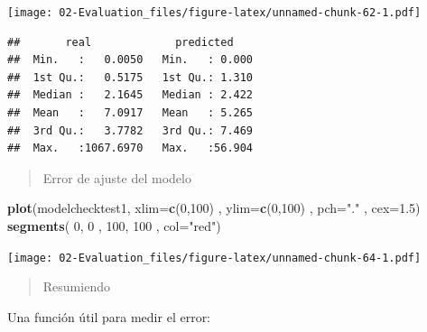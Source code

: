 \documentclass[]{book}
\newenvironment{Shaded}{\begin{snugshade}}{\end{snugshade}}
\newcommand{\DataTypeTok}[1]{\textcolor[rgb]{0.13,0.29,0.53}{#1}}
\newcommand{\DecValTok}[1]{\textcolor[rgb]{0.00,0.00,0.81}{#1}}
\newcommand{\FloatTok}[1]{\textcolor[rgb]{0.00,0.00,0.81}{#1}}
\newcommand{\KeywordTok}[1]{\textcolor[rgb]{0.13,0.29,0.53}{\textbf{#1}}}
\newcommand{\NormalTok}[1]{#1}
\newcommand{\OperatorTok}[1]{\textcolor[rgb]{0.81,0.36,0.00}{\textbf{#1}}}
\newcommand{\StringTok}[1]{\textcolor[rgb]{0.31,0.60,0.02}{#1}}
\begin{document}
\texttt{[image: 02-Evaluation\_files/figure-latex/unnamed-chunk-62-1.pdf]}

\begin{Shaded}
\end{Shaded}

\begin{verbatim}
##       real             predicted     
##  Min.   :   0.0050   Min.   : 0.000  
##  1st Qu.:   0.5175   1st Qu.: 1.310  
##  Median :   2.1645   Median : 2.422  
##  Mean   :   7.0917   Mean   : 5.265  
##  3rd Qu.:   3.7782   3rd Qu.: 7.469  
##  Max.   :1067.6970   Max.   :56.904
\end{verbatim}

\begin{quote}
Error de ajuste del modelo
\end{quote}

\begin{Shaded}
\begin{Highlighting}[]
\KeywordTok{plot}\NormalTok{(modelchecktest1, }\DataTypeTok{xlim=}\KeywordTok{c}\NormalTok{(}\DecValTok{0}\NormalTok{,}\DecValTok{100}\NormalTok{) , }\DataTypeTok{ylim=}\KeywordTok{c}\NormalTok{(}\DecValTok{0}\NormalTok{,}\DecValTok{100}\NormalTok{) ,  }\DataTypeTok{pch=}\StringTok{"."}\NormalTok{ , }\DataTypeTok{cex=}\FloatTok{1.5}\NormalTok{)}
\KeywordTok{segments}\NormalTok{( }\DecValTok{0}\NormalTok{, }\DecValTok{0}\NormalTok{ , }\DecValTok{100}\NormalTok{, }\DecValTok{100}\NormalTok{ , }\DataTypeTok{col=}\StringTok{"red"}\NormalTok{)}
\end{Highlighting}
\end{Shaded}

\texttt{[image: 02-Evaluation\_files/figure-latex/unnamed-chunk-64-1.pdf]}

\begin{quote}
Resumiendo
\end{quote}

Una función útil para medir el error:
\end{document}
